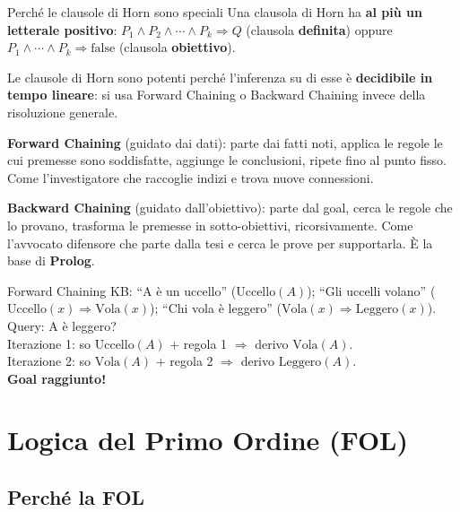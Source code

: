\documentclass[12pt,a4paper]{article}
\begin{document}
\begin{narrativo}{Perché le clausole di Horn sono speciali}
Una clausola di Horn ha \textbf{al più un letterale positivo}: $P_1 \land P_2 \land \cdots \land P_k \Rightarrow Q$ (clausola \textbf{definita}) oppure $P_1 \land \cdots \land P_k \Rightarrow \text{false}$ (clausola \textbf{obiettivo}).

Le clausole di Horn sono potenti perché l'inferenza su di esse è \textbf{decidibile in tempo lineare}: si usa Forward Chaining o Backward Chaining invece della risoluzione generale.

\textbf{Forward Chaining} (guidato dai dati): parte dai fatti noti, applica le regole le cui premesse sono soddisfatte, aggiunge le conclusioni, ripete fino al punto fisso. Come l'investigatore che raccoglie indizi e trova nuove connessioni.

\textbf{Backward Chaining} (guidato dall'obiettivo): parte dal goal, cerca le regole che lo provano, trasforma le premesse in sotto-obiettivi, ricorsivamente. Come l'avvocato difensore che parte dalla tesi e cerca le prove per supportarla. È la base di \textbf{Prolog}.
\end{narrativo}

\begin{esempio}{Forward Chaining}
KB: ``A è un uccello'' ($\text{Uccello}(A)$); ``Gli uccelli volano'' ($\text{Uccello}(x) \Rightarrow \text{Vola}(x)$); ``Chi vola è leggero'' ($\text{Vola}(x) \Rightarrow \text{Leggero}(x)$).\\
Query: A è leggero?\\
Iterazione 1: so $\text{Uccello}(A)$ + regola 1 $\Rightarrow$ derivo $\text{Vola}(A)$.\\
Iterazione 2: so $\text{Vola}(A)$ + regola 2 $\Rightarrow$ derivo $\text{Leggero}(A)$.\\
\textbf{Goal raggiunto!}
\end{esempio}

\section{Logica del Primo Ordine (FOL)}

\subsection{Perché la FOL}
\end{document}
